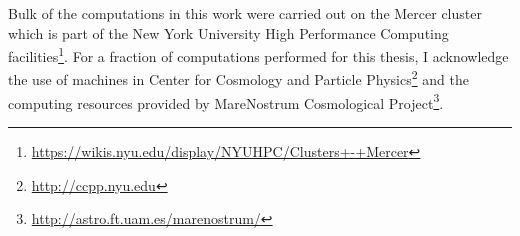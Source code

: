 Bulk of the computations in this work were carried out on the Mercer cluster which is part of the New York University High Performance Computing facilities\footnote{\url{https://wikis.nyu.edu/display/NYUHPC/Clusters+-+Mercer}}. For a fraction of computations performed for this thesis, I acknowledge the use of machines in Center for Cosmology and Particle Physics\footnote{\url{http://ccpp.nyu.edu}} and the computing resources provided by MareNostrum Cosmological Project\footnote{\url{http://astro.ft.uam.es/marenostrum/}}. 
